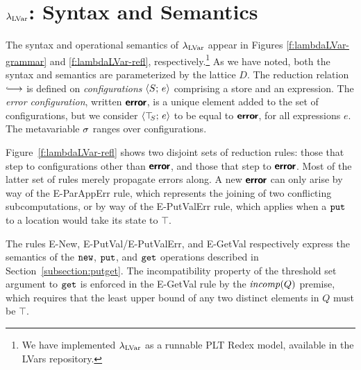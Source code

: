 \section{$\lambda_{\textrm{LVar}}$: Syntax and Semantics}\label{s:lvars-lambdalvar}

The syntax and operational semantics of $\lambda_{\textrm{LVar}}$ appear in
Figures \ref{f:lambdaLVar-grammar} and \ref{f:lambdaLVar-refl},
respectively.\footnote{We have implemented $\lambda_{\textrm{LVar}}$ as a runnable
  PLT Redex \cite{redex-book} model, available in the LVars
  repository.}  As we have noted, both the syntax and semantics are
parameterized by the lattice $D$.  The reduction relation
$\parstepsto$ is defined on \emph{configurations} $\langle S;\, e \rangle$
comprising a store and an expression.  The \emph{error configuration},
written $\textbf{\textsf{error}}$, is a unique element added to the set of
configurations, but we consider $\langle \top\hspace{-0.85mm}_{S};\, e \rangle$ to be equal to
$\textbf{\textsf{error}}$, for all expressions $e$.  The metavariable $\sigma$ ranges
over configurations.

Figure~\ref{f:lambdaLVar-refl} shows two disjoint sets of reduction
rules: those that step to configurations other than $\textbf{\textsf{error}}$, and
those that step to $\textbf{\textsf{error}}$. Most of the latter set of rules merely propagate errors along.
A new $\textbf{\textsf{error}}$ can only
arise by way of the {\sc E-ParAppErr} rule, which represents the joining of two
conflicting subcomputations, or by way of the {\sc E-PutValErr} rule,
which applies when a $\mbox{\texttt{put}}$ to a location would take 
its state to $\top$. 

The rules {\sc E-New}, {\sc E-PutVal}/{\sc E-PutValErr}, and {\sc E-GetVal} respectively express the semantics of
the $\mbox{\texttt{new}}$, $\mbox{\texttt{put}}$, and $\mbox{\texttt{get}}$ operations described in
Section~\ref{subsection:putget}.  
The incompatibility property of the threshold set argument to $\mbox{\texttt{get}}$ 
is enforced in the {\sc E-GetVal} rule by the $\mathit{incomp}(Q)$ premise,
which requires that the
least upper bound of any two distinct elements in $Q$ must be
$\top$.


